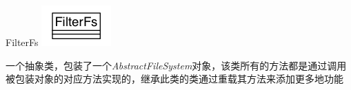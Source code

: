 \begin{XeClass}{FilterFs}
\includegraphics[width=\textwidth]{cdig/FilterFs.png}
     
 一个抽象类，包装了一个\emph{AbstractFileSystem}对象，该类所有的方法都是通过调用
 被包装对象的对应方法实现的，继承此类的类通过重载其方法来添加更多地功能

\end{XeClass}
